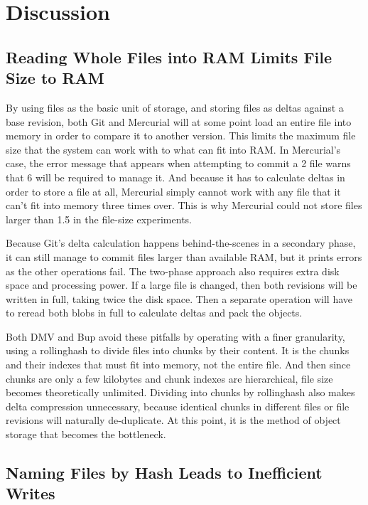 \section{Discussion}

\subsection{Reading Whole Files into RAM Limits File Size to RAM}

By using files as the basic unit of storage, and storing files as deltas against
a base revision, both Git and Mercurial will at some point load an entire file
into memory in order to compare it to another version. This limits the maximum
file size that the system can work with to what can fit into RAM. In Mercurial's
case, the error message that appears when attempting to \gls{commit} a
\SI{2}{\gib} file warns that \SI{6}{\gib} will be required to manage it. And
because it has to calculate deltas in order to store a file at all, Mercurial
simply cannot work with any file that it can't fit into memory three times over.
This is why Mercurial could not store files larger than \SI{1.5}{\gib} in the
file-size experiments.

Because Git's delta calculation happens behind-the-scenes in a secondary phase,
it can still manage to \gls{commit} files larger than available RAM, but it
prints errors as the other operations fail. The two-phase approach also requires
extra disk space and processing power. If a large file is changed, then both
revisions will be written in full, taking twice the disk space. Then a separate
operation will have to reread both \glspl{blob} in full to calculate deltas and
pack the objects.

Both \gls{DMV} and Bup avoid these pitfalls by operating with a finer
granularity, using a \gls{rollinghash} to divide files into chunks by their
content. It is the chunks and their indexes that must fit into memory, not the
entire file. And then since chunks are only a few kilobytes and chunk indexes
are hierarchical, file size becomes theoretically unlimited. Dividing into
chunks by \gls{rollinghash} also makes delta compression unnecessary, because
identical chunks in different files or file revisions will naturally
de-duplicate. At this point, it is the method of object storage that becomes the
bottleneck.


\subsection{Naming Files by Hash Leads to Inefficient Writes}

